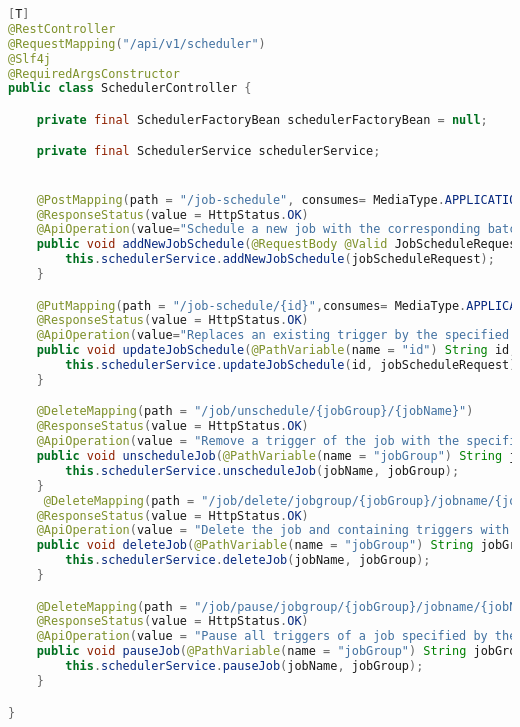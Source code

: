 \begin{lstlisting}[language=JAVA,caption= Scheduler Controller][T]
@RestController
@RequestMapping("/api/v1/scheduler")
@Slf4j
@RequiredArgsConstructor
public class SchedulerController {

    private final SchedulerFactoryBean schedulerFactoryBean = null;

    private final SchedulerService schedulerService;


    @PostMapping(path = "/job-schedule", consumes= MediaType.APPLICATION_JSON_VALUE)
    @ResponseStatus(value = HttpStatus.OK)
    @ApiOperation(value="Schedule a new job with the corresponding batch job settings specified by job group and job name")
    public void addNewJobSchedule(@RequestBody @Valid JobScheduleRequest jobScheduleRequest) throws SchedulerException, JobAlreadyExistException, ClassNotFoundException, IOException, JobNotAvailableException {
        this.schedulerService.addNewJobSchedule(jobScheduleRequest);
    }

    @PutMapping(path = "/job-schedule/{id}",consumes= MediaType.APPLICATION_JSON_VALUE)
    @ResponseStatus(value = HttpStatus.OK)
    @ApiOperation(value="Replaces an existing trigger by the specified job id")
    public void updateJobSchedule(@PathVariable(name = "id") String id, @RequestBody @Valid JobScheduleRequest jobScheduleRequest) throws SchedulerException {
        this.schedulerService.updateJobSchedule(id, jobScheduleRequest);
    }

    @DeleteMapping(path = "/job/unschedule/{jobGroup}/{jobName}")
    @ResponseStatus(value = HttpStatus.OK)
    @ApiOperation(value = "Remove a trigger of the job with the specified job group and job name")
    public void unscheduleJob(@PathVariable(name = "jobGroup") String jobGroup, @PathVariable(name = "jobName") String jobName) throws JobUnscheduleException {
        this.schedulerService.unscheduleJob(jobName, jobGroup);
    }
     @DeleteMapping(path = "/job/delete/jobgroup/{jobGroup}/jobname/{jobName}")
    @ResponseStatus(value = HttpStatus.OK)
    @ApiOperation(value = "Delete the job and containing triggers with the specified job group and job name")
    public void deleteJob(@PathVariable(name = "jobGroup") String jobGroup, @PathVariable(name = "jobName") String jobName) throws JobDeleteException {
        this.schedulerService.deleteJob(jobName, jobGroup);
    }

    @DeleteMapping(path = "/job/pause/jobgroup/{jobGroup}/jobname/{jobName}")
    @ResponseStatus(value = HttpStatus.OK)
    @ApiOperation(value = "Pause all triggers of a job specified by the job group and job name")
    public void pauseJob(@PathVariable(name = "jobGroup") String jobGroup, @PathVariable(name = "jobName") String jobName) throws SchedulerException {
        this.schedulerService.pauseJob(jobName, jobGroup);
    }

}
\end{lstlisting}
